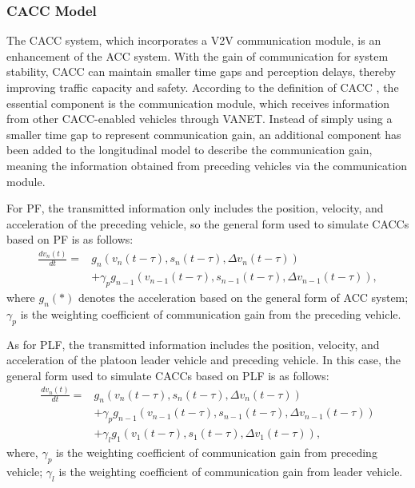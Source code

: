 \documentclass[journal]{IEEEtran}
\begin{document}
\subsubsection{CACC Model}

The CACC system, which incorporates a V2V communication module, is an enhancement of the ACC system. With the gain of communication for system stability, CACC can maintain smaller time gaps and perception delays, thereby improving traffic capacity and safety. According to the definition of CACC \citep{dey2015review}, the essential component is the communication module, which receives information from other CACC-enabled vehicles through VANET. Instead of simply using a smaller time gap to represent communication gain, an additional component has been added to the longitudinal model to describe the communication gain, meaning the information obtained from preceding vehicles via the communication module.


For PF, the transmitted information only includes the position, velocity, and acceleration of the preceding vehicle, so the general form used to simulate CACCs based on PF is as follows:
\begin{equation}
  \begin{aligned}
    \frac{d v_{n}(t)}{d t}= & g_{n}\left(v_{n}(t-\tau), s_{n}(t-\tau), \Delta v_{n}(t-\tau)\right)                      \\
                            & +\gamma_{p} g_{n-1}\left(v_{n-1}(t-\tau), s_{n-1}(t-\tau), \Delta v_{n-1}(t-\tau)\right),
  \end{aligned}
  \label{Eq2}
\end{equation}
where $g_n (*)$ denotes the acceleration based on the general form of ACC system; $\gamma_p$ is the weighting coefficient of communication gain from the preceding vehicle.


As for PLF, the transmitted information includes the position, velocity, and acceleration of the platoon leader vehicle and preceding vehicle. In this case, the general form used to simulate CACCs based on PLF is as follows:
\begin{equation}
  \begin{aligned}
    \frac{d v_{n}(t)}{d t}= & g_{n}\left(v_{n}(t-\tau), s_{n}(t-\tau), \Delta v_{n}(t-\tau)\right)                     \\
                            & +\gamma_{p} g_{n-1}\left(v_{n-1}(t-\tau), s_{n-1}(t-\tau), \Delta v_{n-1}(t-\tau)\right) \\
                            & +\gamma_{l} g_{1}\left(v_{1}(t-\tau), s_{1}(t-\tau), \Delta v_{1}(t-\tau)\right),
  \end{aligned}
  \label{Eq3}
\end{equation}
where, $\gamma_p$ is the weighting coefficient of communication gain from preceding vehicle; $\gamma_l$ is the weighting coefficient of communication gain from leader vehicle.
\end{document}
